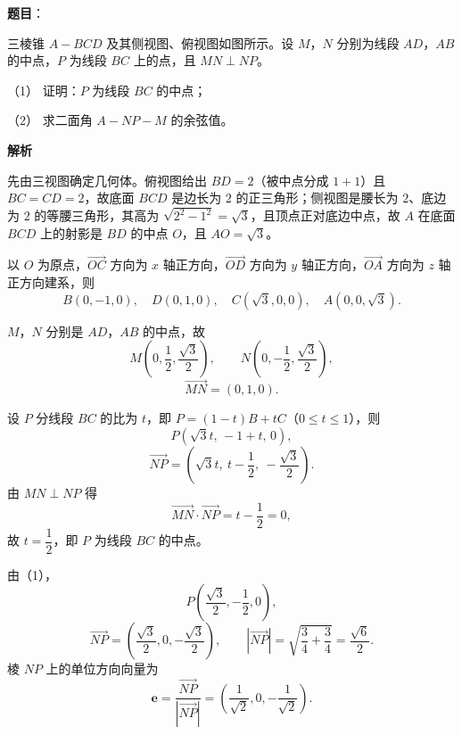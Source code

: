 \begin{answer}

\textbf{题目}：

三棱锥 $A-BCD$ 及其侧视图、俯视图如图所示。设 $M$，$N$ 分别为线段 $AD$，$AB$ 的中点，$P$ 为线段 $BC$ 上的点，且 $MN\perp NP$。

（1） 证明：$P$ 为线段 $BC$ 的中点；

（2） 求二面角 $A-NP-M$ 的余弦值。
\nopagebreak[4]
\begin{center}\end{center}
\nopagebreak[4]
\textbf{解析}

先由三视图确定几何体。俯视图给出 $BD=2$（被中点分成 $1+1$）且 $BC=CD=2$，故底面 $BCD$ 是边长为 $2$ 的正三角形；侧视图是腰长为 $2$、底边为 $2$ 的等腰三角形，其高为 $\sqrt{2^2-1^2}=\sqrt3$，且顶点正对底边中点，故 $A$ 在底面 $BCD$ 上的射影是 $BD$ 的中点 $O$，且 $AO=\sqrt3$。

以 $O$ 为原点，$\overrightarrow{OC}$ 方向为 $x$ 轴正方向，$\overrightarrow{OD}$ 方向为 $y$ 轴正方向，$\overrightarrow{OA}$ 方向为 $z$ 轴正方向建系，则
\nopagebreak[4]
\[B(0,-1,0),\quad D(0,1,0),\quad C(\sqrt3,0,0),\quad A(0,0,\sqrt3).\]


$M$，$N$ 分别是 $AD$，$AB$ 的中点，故
\nopagebreak[4]
\[M\left(0,\frac12,\frac{\sqrt3}2\right),\qquad N\left(0,-\frac12,\frac{\sqrt3}2\right),\]
\nopagebreak[4]
\[\overrightarrow{MN}=\left(0,1,0\right).\]

设 $P$ 分线段 $BC$ 的比为 $t$，即 $P=(1-t)B+tC$（$0\leqslant t\leqslant 1$），则
\nopagebreak[4]
\[P\left(\sqrt3t,\,-1+t,\,0\right),\]
\nopagebreak[4]
\[\overrightarrow{NP}=\left(\sqrt3t,\ t-\frac12,\ -\frac{\sqrt3}2\right).\]
由 $MN\perp NP$ 得
\nopagebreak[4]
\[\overrightarrow{MN}\cdot\overrightarrow{NP}=t-\frac12=0,\]
故 $t=\dfrac12$，即 $P$ 为线段 $BC$ 的中点。


由（1），
\nopagebreak[4]
\[P\left(\frac{\sqrt3}2,-\frac12,0\right),\]
\nopagebreak[4]
\[\overrightarrow{NP}=\left(\frac{\sqrt3}2,0,-\frac{\sqrt3}2\right),\qquad
\left|\overrightarrow{NP}\right|=\sqrt{\frac34+\frac34}=\frac{\sqrt6}2 .\]
棱 $NP$ 上的单位方向向量为
\nopagebreak[4]
\[\boldsymbol e=\frac{\overrightarrow{NP}}{\left|\overrightarrow{NP}\right|}
=\left(\frac1{\sqrt2},0,-\frac1{\sqrt2}\right).\]


\end{answer}
